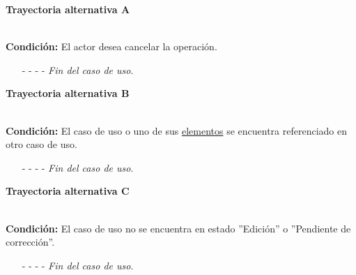 \hypertarget{CU12-3:TAA}{\textbf{Trayectoria alternativa A}}\\
\noindent \textbf{Condición:} El actor desea cancelar la operación.
\begin{enumerate}
	\UCpaso[\UCactor] Oprime el botón  de la pantalla emergente.
	\UCpaso[\UCsist] Muestra la pantalla .
	\item[- -] - - {\em {Fin del caso de uso}}.%
\end{enumerate}
\hypertarget{CU12-3:TAB}{\textbf{Trayectoria alternativa B}}\\
\noindent \textbf{Condición:} El caso de uso o uno de sus \hyperlink{tElemento}{elementos} se encuentra referenciado en otro caso de uso.
\begin{enumerate}
	\UCpaso[\UCsist] Muestra el mensaje  en la pantalla .
	\item[- -] - - {\em {Fin del caso de uso}}.
\end{enumerate}
\hypertarget{CU12-3:TAC}{\textbf{Trayectoria alternativa C}}\\
\noindent \textbf{Condición:} El caso de uso no se encuentra en estado ''Edición'' o ''Pendiente de corrección''.
\begin{enumerate}
	\UCpaso[\UCsist] Oculta el botón \eliminar del caso que no se encuentra en estado de ''Edición'' o ''Pendiente de corrección''.
	\item[- -] - - {\em {Fin del caso de uso}}.
\end{enumerate}
